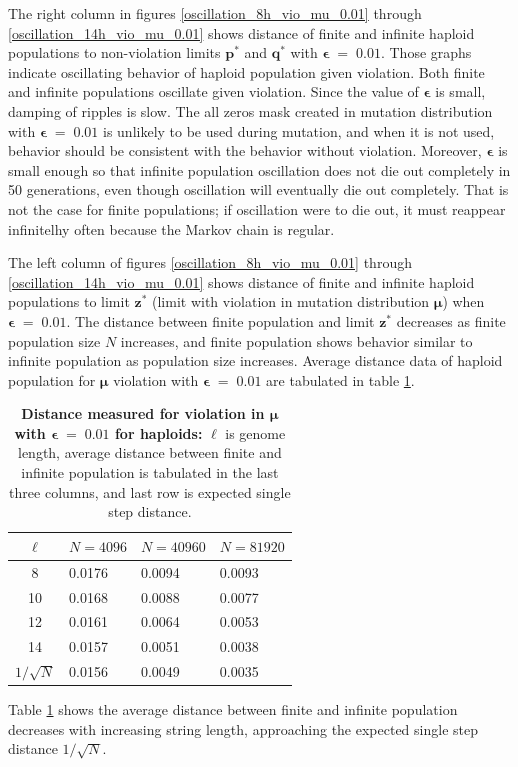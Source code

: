 The right column in figures \ref{oscillation_8h_vio_mu_0.01} through \ref{oscillation_14h_vio_mu_0.01} 
shows distance of finite and infinite haploid populations to non-violation limits $\bm{p^\ast}$ and $\bm{q^\ast}$ with $\bm{\epsilon} \;=\; 0.01$. 
Those graphs indicate oscillating behavior of haploid population given violation. 
Both finite and infinite populations oscillate given violation. Since the value of $\bm{\epsilon}$ 
is small, damping of ripples is slow. The all zeros mask created in mutation distribution with $\bm{\epsilon} \;=\; 0.01$ 
is unlikely to be used during mutation, and when it is not used, behavior should be consistent with the 
behavior without violation. Moreover, $\bm{\epsilon}$ is small enough so that 
infinite population oscillation does not die out completely in 50 generations, 
even though oscillation will eventually die out completely. 
That is not the case for finite populations; if oscillation were to die out, 
it must reappear infinitelhy often because the Markov chain is regular.

The left column of figures \ref{oscillation_8h_vio_mu_0.01} through \ref{oscillation_14h_vio_mu_0.01} 
shows distance of finite and infinite haploid populations to limit $\bm{z^\ast}$ 
(limit with violation in mutation distribution $\bm{\mu}$) when $\bm{\epsilon} \;=\; 0.01$. 
The distance between finite population and limit $\bm{z}^\ast$ 
decreases as finite population size $N$ increases, 
and finite population shows behavior similar to infinite population as population size increases. 
Average distance data of haploid population for $\bm{\mu}$ violation  
with $\bm{\epsilon} \;=\; 0.01$ are tabulated in table \ref{distanceMuHapEps0.01}.

\clearpage
\begin{table}[h]
\caption[\textbf{Distance measured for violation in $\bm{\mu}$ with $\bm{\epsilon} \;=\; 0.01$ for haploids}]
{\textbf{Distance measured for violation in $\bm{\mu}$ with $\bm{\epsilon} \;=\; 0.01$ for haploids:} $\ell$ is genome length, 
average distance between finite and infinite population is tabulated in the last three columns, and last row is expected single step distance.}
\centering
\begin{tabularx}{0.75\textwidth}{ c *{3}{X}}
\toprule
$\ell$ & $N = 4096$ & $N = 40960$ & $N = 81920$ \\
\midrule
8 & 0.0176	& 0.0094	& 0.0093 \\
10 & 0.0168	& 0.0088 	& 0.0077 \\ 
12 & 0.0161	& 0.0064 	& 0.0053 \\
14 & 0.0157	& 0.0051 	& 0.0038 \\ 
\midrule
$1/\sqrt{N}$ & 0.0156 & 0.0049 & 0.0035 \\
\bottomrule
\end{tabularx}
\label{distanceMuHapEps0.01}
\end{table}
Table \ref{distanceMuHapEps0.01} shows the average distance between finite and infinite population decreases with 
increasing string length, approaching the expected single step distance $1/\sqrt{N}$.

